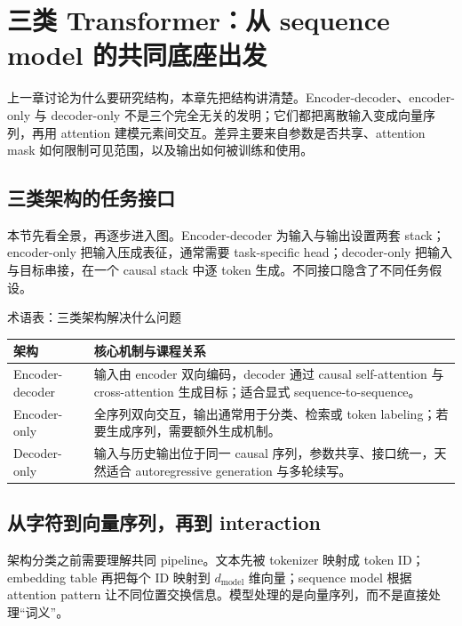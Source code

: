\section{三类 Transformer：从 sequence model 的共同底座出发}

上一章讨论为什么要研究结构，本章先把结构讲清楚。Encoder-decoder、encoder-only 与 decoder-only 不是三个完全无关的发明；它们都把离散输入变成向量序列，再用 attention 建模元素间交互。差异主要来自参数是否共享、attention mask 如何限制可见范围，以及输出如何被训练和使用。

\subsection{三类架构的任务接口}

本节先看全景，再逐步进入图。Encoder-decoder 为输入与输出设置两套 stack；encoder-only 把输入压成表征，通常需要 task-specific head；decoder-only 把输入与目标串接，在一个 causal stack 中逐 token 生成。不同接口隐含了不同任务假设。


\begin{knowledgebox}{术语表：三类架构解决什么问题}
\begin{tabularx}{\textwidth}{L{0.22\textwidth} X}
\toprule
架构 & 核心机制与课程关系 \\
\midrule
Encoder-decoder & 输入由 encoder 双向编码，decoder 通过 causal self-attention 与 cross-attention 生成目标；适合显式 sequence-to-sequence。 \\
Encoder-only & 全序列双向交互，输出通常用于分类、检索或 token labeling；若要生成序列，需要额外生成机制。 \\
Decoder-only & 输入与历史输出位于同一 causal 序列，参数共享、接口统一，天然适合 autoregressive generation 与多轮续写。 \\
\bottomrule
\end{tabularx}
\end{knowledgebox}

\subsection{从字符到向量序列，再到 interaction}

架构分类之前需要理解共同 pipeline。文本先被 tokenizer 映射成 token ID；embedding table 再把每个 ID 映射到 $d_{\text{model}}$ 维向量；sequence model 根据 attention pattern 让不同位置交换信息。模型处理的是向量序列，而不是直接处理“词义”。

